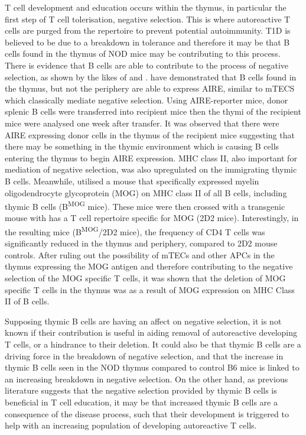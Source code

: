 T cell development and education occurs within the thymus, in particular the first step of T cell tolerisation, negative selection.
This is where autoreactive T cells are purged from the repertoire to prevent potential autoimmunity.
T1D is believed to be due to a breakdown in tolerance and therefore it may be that B cells found in the thymus of NOD mice may be contributing to this process.
There is evidence that B cells are able to contribute to the process of negative selection, as shown by the likes of  and .
\citet{Yamano2015} have demonstrated that B cells found in the thymus, but not the periphery are able to express AIRE, similar to mTECS which classically mediate negative selection.
Using AIRE-reporter mice, donor splenic B cells were transferred into recipient mice then the thymi of the recipient mice were analysed one week after transfer.
It was observed that there were AIRE expressing donor cells in the thymus of the recipient mice suggesting that there may be something in the thymic environment which is causing B cells entering the thymus to begin AIRE expression.
MHC class II, also important for mediation of negative selection, was also upregulated on the immigrating thymic B cells.
Meanwhile, \citet{Frommer2010} utilised a mouse that specifically expressed myelin oligodendrocyte glycoprotein (MOG) on MHC class II of all B cells, including thymic B cells (B\textsuperscript{MOG} mice). 
These mice were then crossed with a transgenic mouse with has a T cell repertoire specific for MOG (2D2 mice).
Interestingly, in the resulting mice (B\textsuperscript{MOG}/2D2 mice), the frequency of CD4 T cells was significantly reduced in the thymus and periphery, compared to 2D2 mouse controls.
After ruling out the possibility of mTECs and other APCs in the thymus expressing the MOG antigen and therefore contributing to the negative selection of the MOG specific T cells, it was shown that the deletion of MOG specific T cells in the thymus was as a result of MOG expression on MHC Class II of B cells. 



Supposing thymic B cells are having an affect on negative selection, it is not known if their contribution is useful in aiding removal of autoreactive developing T cells, or a hindrance to their deletion.
It could also be that thymic B cells are a driving force in the breakdown of negative selection, and that the increase in thymic B cells seen in the NOD thymus compared to control B6 mice is linked to an increasing breakdown in negative selection.
On the other hand, as previous literature suggests that the negative selection provided by thymic B cells is beneficial in T cell education, it may be that increased thymic B cells are a consequence of the disease process, such that their development is triggered to help with an increasing population of developing autoreactive T cells.

